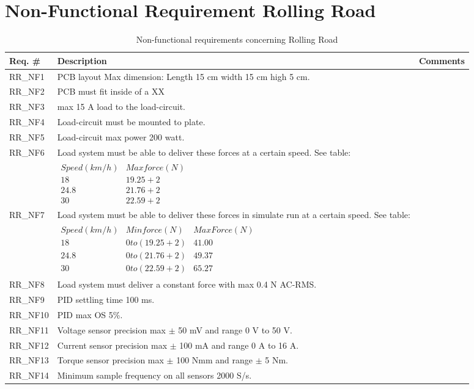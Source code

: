 \section{Non-Functional Requirement Rolling Road}

\begin{table}[h!]
	\label{FREQ_AU2}
	\centering
	\begin{tabular}{|p{2 cm}|p{10 cm}|p{2 cm}|}
		\hline
		\textbf{Req. \#} & \textbf{Description} & \textbf{Comments} \\\hline
		RR\_NF1
		& PCB layout Max dimension: Length 15 cm width 15 cm high 5 cm. 
		&  \\ \hline
		RR\_NF2
		& PCB must fit inside of a XX 
		& \\ \hline
		RR\_NF3
		& max 15 A load to the load-circuit.
		& \\ \hline
		RR\_NF4
		& Load-circuit must be mounted to plate. 
		& \\ \hline
		RR\_NF5
		& Load-circuit max power 200 watt.
		& \\ \hline
		RR\_NF6 
		& Load system must be able to deliver these forces at a certain speed. See table: 
		& \\ &
		$\begin{array}{c|c}
			Speed (km/h) & Max force (N) \\ 
			18 & 19.25+2 \\ 
			24.8 & 21.76+2 \\ 
			30 & 22.59+2
		\end{array} $
		& \\ \hline
		RR\_NF7
		& Load system must be able to deliver these forces in simulate run at a certain speed. See table:
		& \\ &
		$\begin{array}{c|c|c}
			Speed (km/h) & Min force (N) & Max Force (N) \\ 
			18 & 0 to (19.25+2) & 41.00 \\ 
			24.8 & 0 to (21.76+2) & 49.37 \\ 
			30 & 0 to (22.59+2) & 65.27
		\end{array}$
		& \\ \hline
		RR\_NF8
		& Load system must deliver a constant force with max 0.4 N AC-RMS. 
		& \\ \hline
		RR\_NF9
		& PID settling time 100 ms. 
		&  \\ \hline
		RR\_NF10
		& PID max OS 5\%. 
		&  \\ \hline
		RR\_NF11
		& Voltage sensor precision max $\pm$ 50 mV and range 0 V to 50 V. 
		&  \\ \hline
		RR\_NF12
		& Current sensor precision max $\pm$ 100 mA and range 0 A to 16 A. 
		&  \\ \hline
		RR\_NF13
		& Torque sensor precision max $\pm$ 100 Nmm and range $\pm$ 5 Nm. 
		&  \\ \hline
		RR\_NF14
		& Minimum sample frequency on all sensors 2000 S/s.  
		&  \\ \hline
	\end{tabular}
	\caption{Non-functional requirements concerning Rolling Road}
\end{table}


